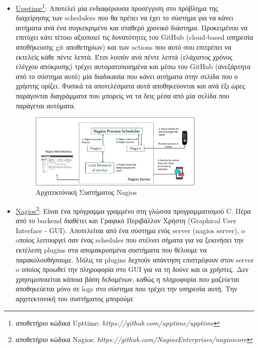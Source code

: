 \begin{itemize}
	\item \href{https://github.com/upptime/upptime}{Upptime\footnote{αποθετήριο κώδικα Upttime: \textit{https://github.com/upptime/upptime}}}: Αποτελεί μία ενδιαφέρουσα προσέγγιση στο πρόβλημα
	      της διαχείρησης των schedulers που θα πρέπει να έχει το σύστημα για να κάνει αιτήματα ανά ένα συγκεκριμένο
	      και σταθερό χρονικό διάστημα. Προκειμένου να επιτύχει κάτι τέτοιο αξιοποιεί τις δυνατότητες του GitHub (cloud-based υπηρεσία αποθήκευσης git αποθετηρίων)
	      και των actions που αυτό σου επιτρέπει να εκτελείς κάθε πέντε λεπτά. Έτσι λοιπόν ανά πέντε λεπτά (ελάχιστος χρόνος ελέγχου απόκρισης)
	      τρέχει αυτοματοποιημένα και μέσω του GitHub (ανεξάρτητα από το σύστημα αυτό) μία διαδικασία που κάνει αιτήματα στην σελίδα που ο χρήστης ορίζει.
	      Φυσικά τα αποτελέσματα αυτά αποθηκεύονται και ανά έξι ώρες παράγονται διαγράμματα που μπορείς να τα δεις μέσα από μία σελίδα που παράγεται αυτόματα.
	      \begin{figure}[!ht]
		      \centering
		      \includegraphics[width=0.8\textwidth]{./images/chapter3/nagios.jpg}
		      \caption[Αρχιτεκτόνική Συστήματος Nagios]{Αρχιτεκτόνική Συστήματος Nagios}
		      \label{fig:nagios}
	      \end{figure}
	\item \href{https://github.com/NagiosEnterprises/nagioscore}{Nagios\footnote{αποθετήριο κώδικα Nagios: \textit{https://github.com/NagiosEnterprises/nagioscore}}}: Είναι ένα πρόγραμμα γραμμένο στη γλώσσα προγραμματισμού
	      C. Πέρα από το backend διαθέτει και Γραφικό Περιβάλλον Χρήστη (Graphical User Interface - GUI).
	      Αποτελείται από ένα σύστημα ενός server (nagios server), o oποίος λειτουργεί σαν ένας scheduler που στέλνει σήματα
	      για να ξεκινήσει την εκτέλεση plugins στα απομακρυσμένα συστήματα που θέλουμε να παρακολουθήσουμε. Μόλις τα plugins δεχτούν
	      απάντηση επιστρέφουν στον server o οποίος προωθεί την πληροφορία στο GUI για να τη δούνε και οι χρήστες. Δεν χρησιμοποιείται κάποια βάση
	      δεδομένων, καθώς η πληροφορία που μαζεύεται αποθηκεύεται μόνο σε logs στο σύστημα που τρέχει την υπηρεσία αυτή. Την αρχιτεκτονική του συστήματος μπορούμε

\end{itemize}

